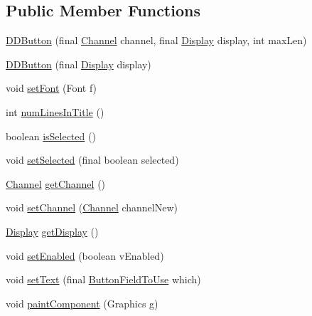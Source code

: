 \subsection*{Public Member Functions}
\begin{DoxyCompactItemize}
\item 
\hyperlink{classgov_1_1fnal_1_1ppd_1_1dd_1_1changer_1_1DDButton_a1afe93de6c48ae6b29f17c945b191a03}{D\-D\-Button} (final \hyperlink{interfacegov_1_1fnal_1_1ppd_1_1dd_1_1signage_1_1Channel}{Channel} channel, final \hyperlink{interfacegov_1_1fnal_1_1ppd_1_1dd_1_1signage_1_1Display}{Display} display, int max\-Len)
\item 
\hyperlink{classgov_1_1fnal_1_1ppd_1_1dd_1_1changer_1_1DDButton_a2f3286123551ed903427c881db67cf4e}{D\-D\-Button} (final \hyperlink{interfacegov_1_1fnal_1_1ppd_1_1dd_1_1signage_1_1Display}{Display} display)
\item 
void \hyperlink{classgov_1_1fnal_1_1ppd_1_1dd_1_1changer_1_1DDButton_a89035df233e1eaf57803ecd7db019f06}{set\-Font} (Font f)
\item 
int \hyperlink{classgov_1_1fnal_1_1ppd_1_1dd_1_1changer_1_1DDButton_aaae6b12a7a8b502ff0f32eda176aaddf}{num\-Lines\-In\-Title} ()
\item 
boolean \hyperlink{classgov_1_1fnal_1_1ppd_1_1dd_1_1changer_1_1DDButton_a322f73398338a9ce0a1c6d15aeee20a7}{is\-Selected} ()
\item 
void \hyperlink{classgov_1_1fnal_1_1ppd_1_1dd_1_1changer_1_1DDButton_a250fc97dc3742590c30daa8d3aeffd97}{set\-Selected} (final boolean selected)
\item 
\hyperlink{interfacegov_1_1fnal_1_1ppd_1_1dd_1_1signage_1_1Channel}{Channel} \hyperlink{classgov_1_1fnal_1_1ppd_1_1dd_1_1changer_1_1DDButton_af6fc03e3fc3a0c0840bd998ebbfafeda}{get\-Channel} ()
\item 
void \hyperlink{classgov_1_1fnal_1_1ppd_1_1dd_1_1changer_1_1DDButton_a760896dce737c9968a8f1ab72bb653b6}{set\-Channel} (\hyperlink{interfacegov_1_1fnal_1_1ppd_1_1dd_1_1signage_1_1Channel}{Channel} channel\-New)
\item 
\hyperlink{interfacegov_1_1fnal_1_1ppd_1_1dd_1_1signage_1_1Display}{Display} \hyperlink{classgov_1_1fnal_1_1ppd_1_1dd_1_1changer_1_1DDButton_a5c930bcfa86e4acf18c046b14c7b0038}{get\-Display} ()
\item 
void \hyperlink{classgov_1_1fnal_1_1ppd_1_1dd_1_1changer_1_1DDButton_a2ec4396ef290b95199f77069790ff0ec}{set\-Enabled} (boolean v\-Enabled)
\item 
void \hyperlink{classgov_1_1fnal_1_1ppd_1_1dd_1_1changer_1_1DDButton_a32de5a82e9cd1be290617bc96da8c580}{set\-Text} (final \hyperlink{enumgov_1_1fnal_1_1ppd_1_1dd_1_1changer_1_1DDButton_1_1ButtonFieldToUse}{Button\-Field\-To\-Use} which)
\item 
void \hyperlink{classgov_1_1fnal_1_1ppd_1_1dd_1_1changer_1_1DDButton_acca8d932a7550df1e80a93d13be95110}{paint\-Component} (Graphics g)
\end{DoxyCompactItemize}


